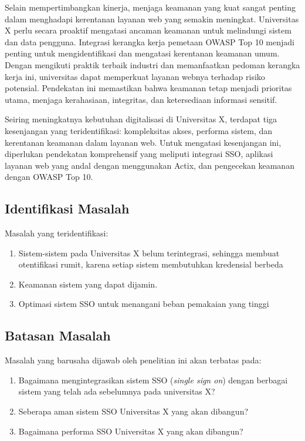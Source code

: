 \documentclass{article}
\begin{document}
Selain mempertimbangkan kinerja, menjaga keamanan yang kuat sangat penting dalam menghadapi kerentanan layanan web yang semakin meningkat. Universitas X perlu secara proaktif mengatasi ancaman keamanan untuk melindungi sistem dan data pengguna. Integrasi kerangka kerja pemetaan OWASP Top 10 menjadi penting untuk mengidentifikasi dan mengatasi kerentanan keamanan umum. Dengan mengikuti praktik terbaik industri dan memanfaatkan pedoman kerangka kerja ini, universitas dapat memperkuat layanan webnya terhadap risiko potensial. Pendekatan ini memastikan bahwa keamanan tetap menjadi prioritas utama, menjaga kerahasiaan, integritas, dan ketersediaan informasi sensitif.

Seiring meningkatnya kebutuhan digitalisasi di Universitas X, terdapat tiga kesenjangan yang teridentifikasi: kompleksitas akses, performa sistem, dan kerentanan keamanan dalam layanan web. Untuk mengatasi kesenjangan ini, diperlukan pendekatan komprehensif yang meliputi integrasi SSO, aplikasi layanan web yang andal dengan menggunakan Actix, dan pengecekan keamanan dengan OWASP Top 10.


\subsection{Identifikasi Masalah}
Masalah yang teridentifikasi:
\begin{enumerate}
    \item Sistem-sistem pada Universitas X belum terintegrasi, sehingga membuat otentifikasi rumit, karena setiap sistem membutuhkan kredensial berbeda
    \item Keamanan sistem yang dapat dijamin.
    \item Optimasi sistem SSO untuk menangani beban pemakaian yang tinggi
\end{enumerate}
\subsection{Batasan Masalah}
Masalah yang barusaha dijawab oleh penelitian ini akan terbatas pada:
\begin{enumerate}
    \item Bagaimana mengintegrasikan sistem SSO (\emph{single sign on}) dengan berbagai sistem yang telah ada sebelumnya pada universitas X?
    \item Seberapa aman sistem SSO Universitas X yang akan dibangun?
    \item Bagaimana performa SSO Universitas X yang akan dibangun?
\end{enumerate}
\end{document}
